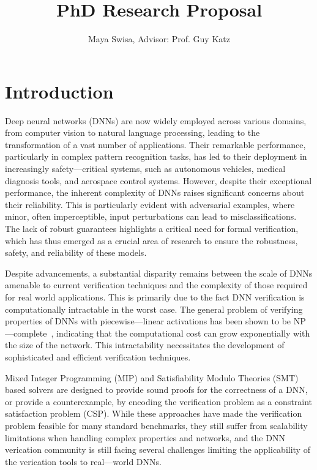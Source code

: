 \documentclass{llncs}
\title{PhD Research Proposal}
\author{
  \vspace{-1.5cm}
 	Maya Swisa, Advisor: Prof. Guy Katz
}
\institute{ 
 	The Hebrew University of Jerusalem
 }
\begin{document}
 
\maketitle

\section{Introduction}\label{sec:Introduction}
Deep neural networks (DNNs) are now widely employed across various domains, from computer vision to natural language processing, 
leading to the transformation of a vast number of applications. Their remarkable performance, particularly in complex pattern recognition tasks, 
has led to their deployment in increasingly safety---critical systems, such as autonomous vehicles, medical diagnosis tools, and aerospace control systems.  
However, despite their exceptional performance, the inherent complexity of DNNs raises significant concerns about their reliability. 
This is particularly evident with adversarial examples, where minor, often imperceptible, input perturbations can lead to misclassifications. 
The lack of robust guarantees highlights a critical need for formal verification, which has thus emerged as a crucial area of research to ensure the robustness, 
safety, and reliability of these models.

Despite advancements, a substantial disparity remains between the scale of DNNs amenable to current verification techniques 
and the complexity of those required for real world applications. 
This is primarily due to the fact DNN verification is computationally intractable in the worst case.
The general problem of verifying properties of DNNs with piecewise---linear activations has been shown to be NP---complete~\cite{KBD17}, indicating that the computational 
cost can grow exponentially with the size of the network. This intractability necessitates the development of sophisticated and efficient verification techniques.

Mixed Integer Programming (MIP) and Satisfiability Modulo Theories (SMT) based solvers are designed to provide sound proofs for the correctness of a 
DNN, or provide a counterexample, by encoding the verification problem as a constraint satisfaction problem (CSP). 
While these approaches have made the verification problem feasible for many standard benchmarks, they still suffer from scalability limitations when handling complex
properties and networks, and the DNN verication community is still facing several challenges limiting the applicability of the verication tools to
real---world DNNs.
\end{document}
